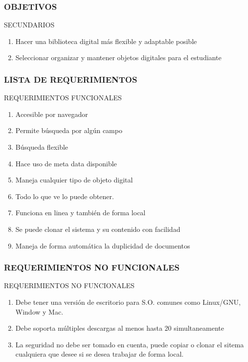 \documentclass[article]{beamer}
\begin{document}

\begin{frame}
\frametitle{OBJETIVOS}

\begin{block}{SECUNDARIOS}
\begin{enumerate}
\item Hacer una biblioteca digital más flexible y adaptable posible
\item Seleccionar organizar y mantener objetos digitales para el estudiante
\end{enumerate}

\end{block}
\end{frame}



\begin{frame}
\frametitle{LISTA DE REQUERIMIENTOS}
\begin{block}{REQUERIMIENTOS FUNCIONALES}
\begin{enumerate}
\item Accesible por navegador
\item Permite búsqueda por algún campo
\item Búsqueda flexible
\item Hace uso de meta data disponible
\item Maneja cualquier tipo de objeto digital
\item Todo lo que ve lo puede obtener.
\item Funciona en linea y también de forma local
\item Se puede clonar el sistema y su contenido con facilidad
\item Maneja de forma automática la duplicidad de documentos
\end{enumerate}
\end{block}
\end{frame}



\begin{frame}[fragile]
\frametitle{REQUERIMIENTOS NO FUNCIONALES}
\begin{block}{REQUERIMIENTOS NO FUNCIONALES}
\begin{enumerate}
\item Debe tener una versión de escritorio para S.O. comunes como Linux/GNU, Window y Mac.
\item Debe soporta múltiples descargas al menos hasta 20 simultaneamente
\item  La seguridad no debe ser tomado en cuenta, puede copiar o clonar el sitema cualquiera que desee si se desea
trabajar de forma local.
\end{enumerate}
\end{block}

\end{frame}
\end{document}
